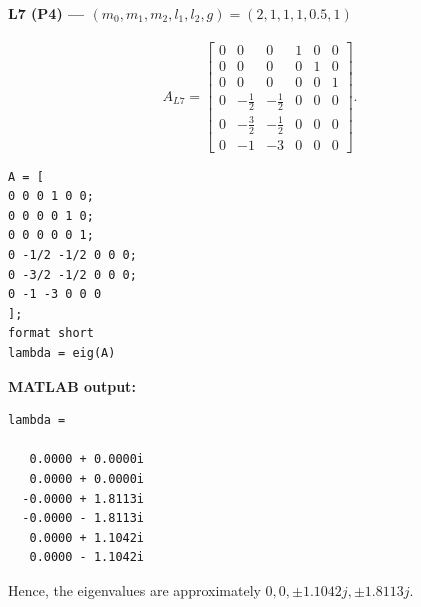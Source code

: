 \documentclass[12pt,a4paper]{article}
\begin{document}
\vspace{0.3cm}

\Needspace{2cm}
\paragraph*{L7 (P4) --- $(m_0,m_1,m_2,l_1,l_2,g)=(2,1,1,1,0.5,1)$}

\[
A_{L7}=\begin{bmatrix}
0 & 0 & 0 & 1 & 0 & 0 \\
0 & 0 & 0 & 0 & 1 & 0 \\
0 & 0 & 0 & 0 & 0 & 1 \\
0 & -\frac{1}{2} & -\frac{1}{2} & 0 & 0 & 0 \\
0 & -\frac{3}{2} & -\frac{1}{2} & 0 & 0 & 0 \\
0 & -1 & -3 & 0 & 0 & 0
\end{bmatrix}.
\]
\begin{lstlisting}
A = [
0 0 0 1 0 0;
0 0 0 0 1 0;
0 0 0 0 0 1;
0 -1/2 -1/2 0 0 0;
0 -3/2 -1/2 0 0 0;
0 -1 -3 0 0 0
];
format short
lambda = eig(A)
\end{lstlisting}

\textbf{MATLAB output:}
\begin{lstlisting}[language={}]
lambda =

   0.0000 + 0.0000i
   0.0000 + 0.0000i
  -0.0000 + 1.8113i
  -0.0000 - 1.8113i
   0.0000 + 1.1042i
   0.0000 - 1.1042i
\end{lstlisting}
Hence, the eigenvalues are approximately $0,0,\pm 1.1042j,\pm 1.8113j$.

\vspace{0.3cm}
\end{document}
